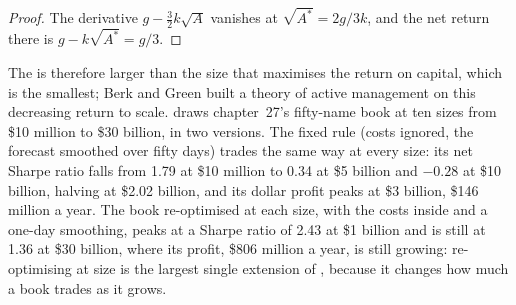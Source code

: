 \begin{proof}
The derivative $g - \frac32 k\sqrt A$ vanishes at $\sqrt{A^*} = 2g/3k$, and the net return there is $g - k\sqrt{A^*} = g/3$.
\end{proof}

The  is therefore larger than the size that maximises the return on capital, which is the smallest; Berk and Green built a theory of
active management on this decreasing return to scale.  draws chapter~27's fifty-name book at ten sizes from
\$10 million to \$30 billion, in two versions. The fixed rule (costs ignored, the forecast smoothed over fifty days) trades the same way at every size: its net
Sharpe ratio falls from 1.79 at \$10 million to 0.34 at \$5 billion and $-0.28$ at \$10 billion, halving at \$2.02 billion, and its dollar profit peaks at \$3
billion, \$146 million a year. The book re-optimised at each size, with the costs inside and a one-day smoothing, peaks at a Sharpe ratio of 2.43 at \$1 billion
and is still at 1.36 at \$30 billion, where its profit, \$806 million a year, is still growing: re-optimising at size is the largest single extension of
, because it changes how much a book trades as it grows.


